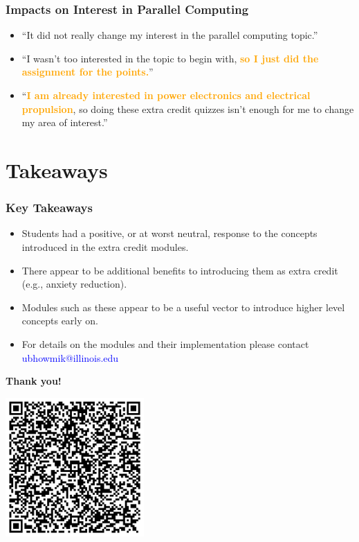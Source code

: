 \documentclass{beamer}
\begin{document}
\begin{frame}
    \frametitle{Impacts on Interest in Parallel Computing}

    \begin{figure}
      
    \end{figure}

    \vfill
    \begin{itemize}
        \item ``It did not really change my interest in the parallel computing topic.'' \\ \vspace{0.25cm} 
        \item ``I wasn't too interested in the topic to begin with, \textcolor{orange}{\textbf{so I just did the assignment for the points.}}''\\ \vspace{0.25cm}
        \item ``\textcolor{orange}{\textbf{I am already interested in power electronics and electrical propulsion}}, so doing these extra credit quizzes isn't enough for me to change my area of interest.''
    \end{itemize}

\end{frame}

\section{Takeaways}

\begin{frame}
    \frametitle{Key Takeaways}

    \begin{itemize}
      \item Students had a positive, or at worst neutral, response to the concepts introduced in the extra credit modules.
      \item There appear to be additional benefits to introducing them as extra credit (e.g., anxiety reduction).
      \item Modules such as these appear to be a useful vector to introduce higher level concepts early on.
      \item For details on the modules and their implementation please contact \textcolor{blue}{ubhowmik@illinois.edu}
    \end{itemize}
    \vfill
     \begin{centered}
         \textbf{\Large Thank you!}
     \end{centered}
     \includegraphics[width=200px]{HavingitAll.svg}
\end{frame}
\end{document}
